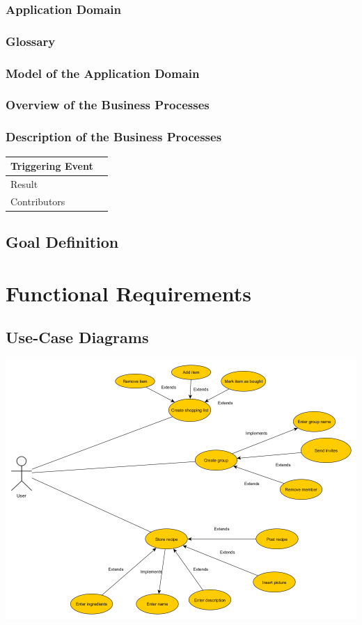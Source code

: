 \documentclass[12pt]{article}
\theoremstyle{definition}
\begin{document}
\subsubsection{Application Domain}

\subsubsection{Glossary}

\subsubsection{Model of the Application Domain}

\subsubsection{Overview of the Business Processes}

\subsubsection{Description of the Business Processes}

\begin{tabular}{|l|l|}
\hline
Triggering Event &  \\ \hline
Result &  \\ \hline
Contributors &  \\ \hline
\end{tabular}

\subsection{Goal Definition}

\pagebreak

\section{Functional Requirements}

\subsection{Use-Case Diagrams}

\includegraphics[scale=.5]{UseCase.png}
\end{document}
